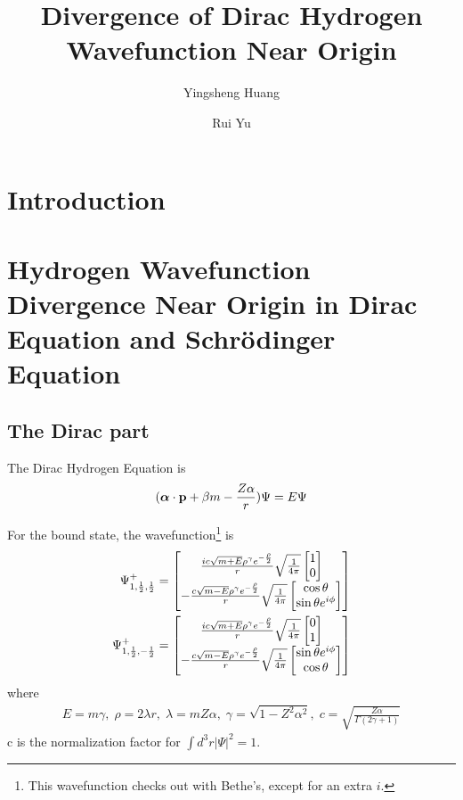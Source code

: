 \documentclass[aps,prd,preprint,showkeys,notitlepage,10pt]{revtex4-1}
\newcommand{\vbp}{\vb{p}}
\renewcommand{\a}{\alpha}
\renewcommand{\b}{\beta}
\begin{document}
\title{Divergence of Dirac Hydrogen Wavefunction Near Origin}
\author{Yingsheng Huang}
\author{Rui Yu}


\begin{abstract}

\end{abstract}
\keywords{}

\maketitle

\section*{Introduction}
\section{Hydrogen Wavefunction Divergence Near Origin in Dirac Equation and Schr\"odinger Equation}
\subsection{The Dirac part}
The Dirac Hydrogen Equation is
\begin{align}
	(\bm{\a}\cdot \vbp+\b m-\frac{Z\a}{r} )\Psi=E\Psi
\end{align}

For the bound state, the wavefunction\footnote{This wavefunction checks out with Bethe's, except for an extra $i$. } is\cite{Darwin1928,Gordon1928,Bethe2008}
\begin{align}
	\Psi^+_{1,\frac{1}{2},\frac{1}{2}}  & =\bmqty{\frac{ic\sqrt{m+E}\rho^{\gamma}e^{-\frac{\rho}{2}}}{r}\sqrt{\frac{1}{4\pi}}\bmqty{1 \\0}\\-\frac{c\sqrt{m-E}\rho^{\gamma}e^{-\frac{\rho}{2}}}{r}\sqrt{\frac{1}{4\pi}}\bmqty{\cos\theta\\\sin\theta e^{i\phi}}}\\
	\Psi^+_{1,\frac{1}{2},-\frac{1}{2}} & =\bmqty{\frac{ic\sqrt{m+E}\rho^{\gamma}e^{-\frac{\rho}{2}}}{r}\sqrt{\frac{1}{4\pi}}\bmqty{0 \\1}\\-\frac{c\sqrt{m-E}\rho^{\gamma}e^{-\frac{\rho}{2}}}{r}\sqrt{\frac{1}{4\pi}}\bmqty{\sin\theta e^{i\phi}\\\cos\theta}}
\end{align}
where
\begin{align}
	E=m\gamma,\;\rho=2\lambda r,\;\lambda=mZ\a,\;
	\gamma=\sqrt{1-Z^2\a^2},\;c=\sqrt{\frac{Z\a}{\Gamma(2\gamma+1)}}
\end{align}
c is the normalization factor for $\int d^3r|\Psi|^2=1$.
\end{document}
